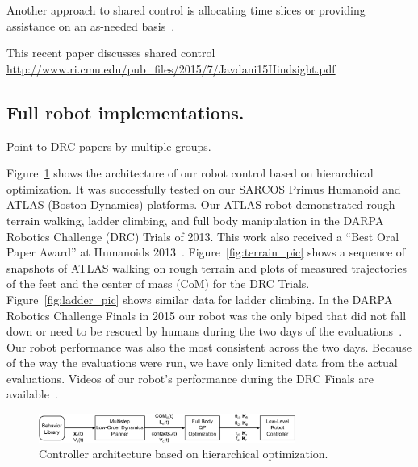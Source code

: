 \documentclass[letterpaper,12pt,fullpage]{article}
\begin{document}
Another approach to shared control is allocating time slices or providing assistance
on an as-needed basis~\cite{IEEE07140030}.

This recent paper discusses shared control \url{http://www.ri.cmu.edu/pub_files/2015/7/Javdani15Hindsight.pdf}

\subsection{Full robot implementations.}

Point to DRC papers by multiple groups.

Figure~\ref{f:cga1} shows the architecture of our robot control based on hierarchical optimization. 
It was successfully tested on our SARCOS Primus Humanoid
and ATLAS (Boston Dynamics) platforms. Our ATLAS robot demonstrated rough terrain walking, ladder climbing, and full body manipulation in the DARPA Robotics Challenge (DRC) Trials of 2013. This work also received 
a ``Best Oral Paper Award'' at Humanoids 2013~\cite{Feng/etal13}. Figure~\ref{fig:terrain_pic} shows a sequence of snapshots of ATLAS 
walking on rough terrain and plots of measured trajectories of the feet and the center of mass (CoM) for the DRC Trials.
Figure~\ref{fig:ladder_pic} shows similar data for ladder climbing.
In the DARPA Robotics Challenge Finals in 2015 our robot was the only
biped that did not fall down or need to be rescued by 
humans during the two days of the evaluations~\cite{cga-hum15}.
Our robot performance was also the most consistent across the two days.
Because of the way the evaluations were run, we have only limited data
from the actual evaluations. Videos of our robot's performance during the
DRC Finals are available~\cite{cga-web-page}.


\begin{figure}[t!]
\centering
\includegraphics[width=0.75\textwidth]{Figures/cga1_modified}
\caption{Controller architecture based on hierarchical optimization.}
\label{f:cga1}
\end{figure}
\end{document}

